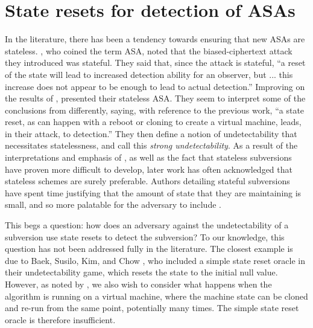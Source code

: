 \section{State resets for detection of ASAs}
In the literature, there has been a tendency towards ensuring that new ASAs are stateless. \cite{C:BelPatRog14}, who coined the term ASA, noted that the biased-ciphertext attack they introduced was stateful. They said that, since the attack is stateful, ``a reset of the state will lead to increased detection ability for an observer, but ... this increase does not appear to be enough to lead to actual detection.'' Improving on the results of \cite{C:BelPatRog14}, \cite{CCS:BelJaeKan15} presented their stateless ASA. They seem to interpret some of the conclusions from \cite{C:BelPatRog14} differently, saying, with reference to the previous work, ``a state reset, as can happen with a reboot or cloning to create a virtual machine, leads, in their attack, to detection.'' They then define a notion of undetectability that necessitates statelessness, and call this \emph{strong undetectability}. As a result of the interpretations and emphasis of \cite{CCS:BelJaeKan15}, as well as the fact that stateless subversions have proven more difficult to develop, later work has often acknowledged that stateless schemes are surely preferable. Authors detailing stateful subversions have spent time justifying that the amount of state that they are maintaining is small, and so more palatable for the adversary to include \cite{BSKC2019,AC:CheHuaYun20}.

This begs a question: how does an adversary against the undetectability of a subversion use state resets to detect the subversion? To our knowledge, this question has not been addressed fully in the literature. The closest example is due to Baek, Susilo, Kim, and Chow \cite{BSKC2019}, who included a simple state reset oracle in their undetectability game, which resets the state to the initial null value. However, as noted by \cite{CCS:BelJaeKan15}, we also wish to consider what happens when the algorithm is running on a virtual machine, where the machine state can be cloned and re-run from the same point, potentially many times. The simple state reset oracle is therefore insufficient.

